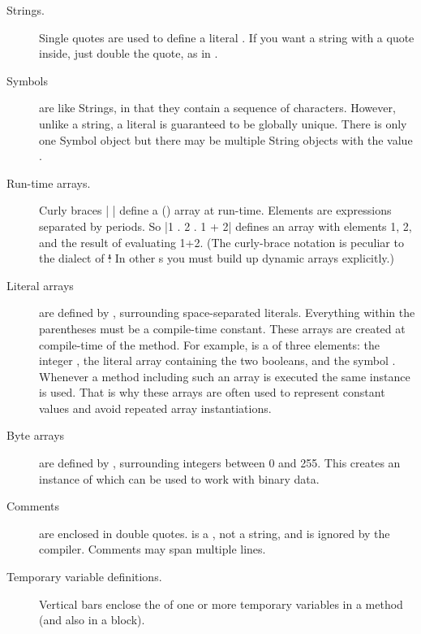\documentclass[a4paper,10pt,twoside]{book}
\begin{document}
\begin{description}
\item[Strings.]
	Single quotes are used to define a literal .
	If you want a string with a quote inside, just double the quote, as in .

\item[Symbols] are like Strings, in that they contain a sequence of characters.
	However, unlike a string, a literal  is guaranteed to be globally unique.
	There is only one Symbol object  but there may be multiple String objects with the value .

\item[Run-time arrays.]
	Curly braces \ct|{ }| define a () array at run-time.
	Elements are expressions separated by periods.
	So \ct|{1 . 2 . 1 + 2}| defines an array with elements 1, 2, and the result of evaluating 1+2.
	(The curly-brace notation is peculiar to the \sq dialect of \st!
	In other \st{}s you must build up dynamic arrays explicitly.)

\item[Literal arrays] are defined by \ct{#( )}, surrounding space-separated literals.
	Everything within the parentheses must be a compile-time constant.
	These arrays are created at compile-time of the method.
	For example,  is a   of three elements: the integer , the literal array containing the two booleans, and the symbol .
	Whenever a method including such an array is executed the same instance is used.
	That is why these arrays are often used to represent constant values and avoid repeated array instantiations.

\item[Byte arrays] are defined by \ct{#[ ]}, surrounding integers between 0 and 255.
	This creates an instance of  which can be used to work with binary data.

\item[Comments] are enclosed in double quotes.
	 is a , not a string, and is ignored by the \sq compiler.
	Comments may span multiple lines.

\item[Temporary variable definitions.]
	Vertical bars \ct{| |} enclose the  of one or more temporary variables in a method (and also in a block).


\end{description}
\end{document}
